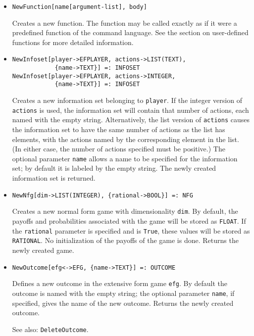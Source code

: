 \begin{itemize}
\item   
\protect \large \begin{verbatim}
NewFunction[name[argument-list], body]
\end{verbatim}\normalsize

\bd
Creates a new function.  The function may be called exactly
as if it were a predefined function of the command language.  See the
section on user-defined functions for more detailed information.
\ed

\item
\protect \large \begin{verbatim} 
NewInfoset[player->EFPLAYER, actions->LIST(TEXT),
            {name->TEXT}] =: INFOSET
NewInfoset[player->EFPLAYER, actions->INTEGER,
            {name->TEXT}] =: INFOSET
\end{verbatim}\normalsize

\bd
Creates a new information set belonging to \verb+player+.
If the integer version of \verb+actions+ is used, the information set
will contain that number of actions, each named with the empty string.
Alternatively, the list version of \verb+actions+ causes the information
set to have the same number of actions as the list has elements, with
the actions named by the corresponding element in the list.  (In either
case, the number of actions specified must be positive.)  The optional
parameter \verb+name+ allows a name to be specified for the information
set; by default it is labeled by the empty string.  The newly created
information set is returned.
\ed

\item
\protect \large \begin{verbatim}
NewNfg[dim->LIST(INTEGER), {rational->BOOL}] =: NFG
\end{verbatim}\normalsize

\bd
Creates a new normal form game with dimensionality \verb+dim+.
By default, the payoffs and probabilities associated with the game will
be stored as {\tt FLOAT}.  If the \verb+rational+ parameter is specified
and is \verb+True+, these values will be stored as {\tt RATIONAL}.
No initialization of the payoffs of the game is done.
Returns the newly created game.
\ed

\item
\protect \large \begin{verbatim} 
NewOutcome[efg<->EFG, {name->TEXT}] =: OUTCOME
\end{verbatim}\normalsize

\bd
Defines a new outcome in the extensive form game \verb+efg+.
By default the outcome is named with the empty string; the optional parameter
\verb+name+, if specified, gives the name of the new outcome.  Returns the
newly created outcome.
\item
[See also:] {\tt DeleteOutcome}.
\ed


\end{itemize}

